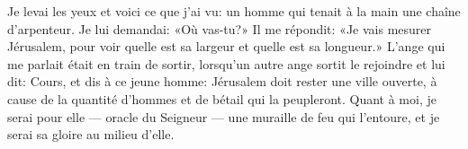 Je levai les yeux et voici ce que j’ai vu:
	un homme qui tenait à la main une chaîne d’arpenteur.
Je lui demandai: «Où vas-tu?»
Il me répondit: «Je vais mesurer Jérusalem,
	pour voir quelle est sa largeur et quelle est sa longueur.»
L’ange qui me parlait était en train de sortir,
	lorsqu’un autre ange sortit le rejoindre et lui dit:
	Cours, et dis à ce jeune homme:
	Jérusalem doit rester une ville ouverte,
	à cause de la quantité d’hommes et de bétail qui la peupleront.
Quant à moi, je serai pour elle --- oracle du Seigneur ---
	une muraille de feu qui l’entoure, et je serai sa gloire au milieu d’elle.
